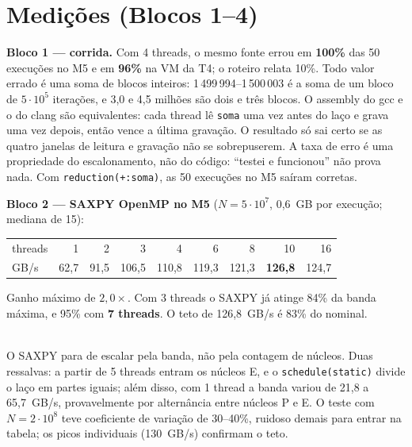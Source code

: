 \documentclass[10pt,a4paper]{article}
\begin{document}
\section{Medições (Blocos 1–4)}
\textbf{Bloco 1 — corrida.} Com 4 threads, o mesmo fonte errou em \textbf{100\%} das 50 execuções no M5 e em \textbf{96\%} na VM da T4; o roteiro relata 10\%.
Todo valor errado é uma soma de blocos inteiros: 1\,499\,994–1\,500\,003 é a soma de um bloco de $5\cdot10^5$ iterações, e 3,0 e 4,5 milhões são dois e três blocos.
O assembly do gcc e o do clang são equivalentes: cada thread lê \texttt{soma} uma vez antes do laço e grava uma vez depois, então vence a última gravação.
O resultado só sai certo se as quatro janelas de leitura e gravação não se sobrepuserem. A taxa de erro é uma propriedade do escalonamento, não do código: ``testei e funcionou'' não prova nada.
Com \texttt{reduction(+:soma)}, as 50 execuções no M5 saíram corretas.

\textbf{Bloco 2 — SAXPY OpenMP no M5} ($N=5\cdot10^7$, 0,6~GB por execução; mediana de 15):\\[1pt]
{\small\begin{tabular}{@{}lrrrrrrrr@{}}
\toprule
threads & 1 & 2 & 3 & 4 & 6 & 8 & 10 & 16 \\
GB/s & 62,7 & 91,5 & 106,5 & 110,8 & 119,3 & 121,3 & \textbf{126,8} & 124,7 \\
\bottomrule
\end{tabular}}\quad
\parbox[b]{7.3cm}{\small Ganho máximo de $2{,}0\times$. Com 3 threads o SAXPY já atinge 84\% da banda máxima, e 95\% com \textbf{7 threads}. O teto de 126,8~GB/s é 83\% do nominal.}\\[1pt]
O SAXPY para de escalar pela banda, não pela contagem de núcleos.
Duas ressalvas: a partir de 5 threads entram os núcleos E, e o \texttt{schedule(static)} divide o laço em partes iguais; além disso, com 1 thread a banda variou de 21,8 a 65,7~GB/s, provavelmente por alternância entre núcleos P e E.
O teste com $N=2\cdot10^8$ teve coeficiente de variação de 30–40\%, ruidoso demais para entrar na tabela; os picos individuais (130~GB/s) confirmam o teto.
\end{document}
